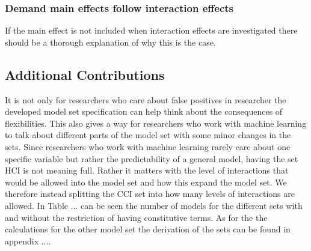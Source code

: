 \subsubsection{Demand main effects follow interaction effects}
If the main effect is not included when interaction effects are investigated there should be a thorough explanation of why this is the case.


\subsection{Additional Contributions}

It is not only for researchers who care about false positives in researcher the developed model set specification can help think about the consequences of flexibilities. This also gives a way for researchers who work with machine learning to talk about different parts of the model set with some minor changes in the sets. Since researchers who work with machine learning rarely care about one specific variable but rather the predictability of a general model, having the set HCI is not meaning full. Rather it matters with the level of interactions that would be allowed into the model set and how this expand the model set. We therefore instead splitting the CCI set into how many levels of interactions are allowed. In Table ... can be seen the number of models for the different sets with and without the restriction of having constitutive terms. As for the the calculations for the other model set the derivation of the sets can be found in appendix .... 


 
